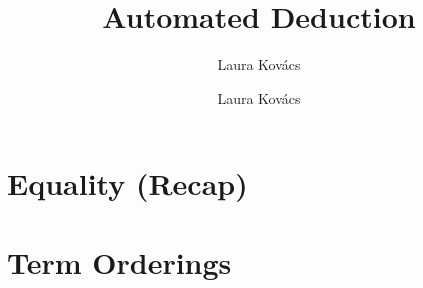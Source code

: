 \documentclass[10pt]{beamer}
\author{
  \textcolor{red!90!black}{Laura Kov\'acs}}
\title{
              	       Automated Deduction
}
\author{
  \textcolor{red!90!black}{Laura Kov\'acs} \\
\titlegraphic{\hspace*{1em}\texttt{[image: forsyte]}}}
\begin{document}
\date{}
\frame{\titlepage}

%

%


%


\section{Equality (Recap)}


\section{Term Orderings}

\end{document}
